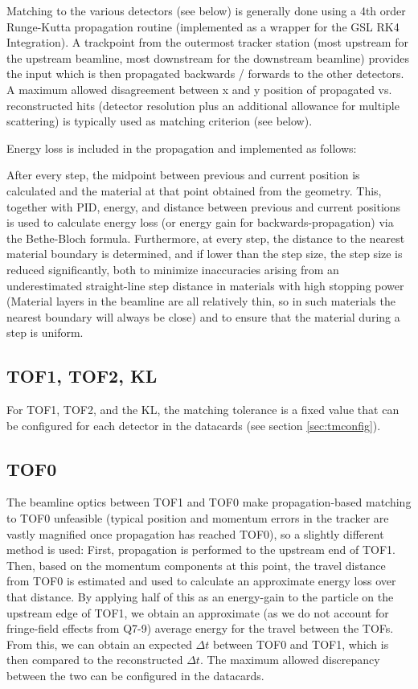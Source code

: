 Matching to the various detectors (see below) is generally done using a 4th order Runge-Kutta propagation routine
(implemented as a wrapper for the GSL RK4 Integration). A trackpoint from the outermost tracker station (most
upstream for the upstream beamline, most downstream for the downstream beamline) provides the input which is then
propagated backwards / forwards to the other detectors. A maximum allowed disagreement between x and y position of
propagated vs. reconstructed hits (detector resolution plus an additional allowance for multiple scattering) is
typically used as matching criterion (see below).

Energy loss is included in the propagation and implemented as follows:

After every step, the midpoint between previous and current position is calculated and the material at that point
obtained from the geometry. This, together with PID, energy, and distance between previous and current positions
is used to calculate energy loss (or energy gain for backwards-propagation) via the Bethe-Bloch formula. Furthermore,
at every step, the distance to the nearest material boundary is determined, and if lower than the step size, the
step size is reduced significantly, both to minimize inaccuracies arising from an underestimated straight-line step
distance in materials with high stopping power (Material layers in the beamline are all relatively thin, so in such
materials the nearest boundary will always be close) and to ensure that the material during a step is uniform.

\subsection{TOF1, TOF2, KL}\label{subsec:tmtof12kl}

For TOF1, TOF2, and the KL, the matching tolerance is a fixed value that can be configured for each detector in the
datacards (see section \ref{sec:tmconfig}).

\subsection{TOF0}\label{subsec:tmtof0}

The beamline optics between TOF1 and TOF0 make propagation-based matching to TOF0 unfeasible (typical position and
momentum errors in the tracker are vastly magnified once propagation has reached TOF0), so a slightly different method
is used: First, propagation is performed to the upstream end of TOF1. Then, based on the momentum components at this
point, the travel distance from TOF0 is estimated and used to calculate an approximate energy loss over that distance.
By applying half of this as an energy-gain to the particle on the upstream edge of TOF1, we obtain an approximate
(as we do not account for fringe-field effects from Q7-9) average energy for the travel between the TOFs. From this,
we can obtain an expected $\Delta t$ between TOF0 and TOF1, which is then compared to the reconstructed $\Delta t$.
The maximum allowed discrepancy between the two can be configured in the datacards.

